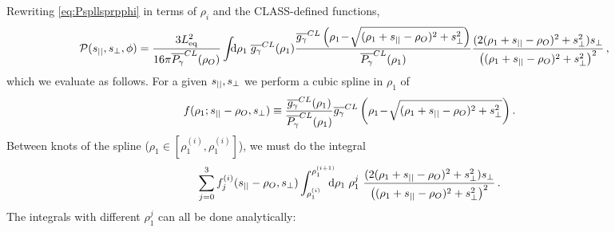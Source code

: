 \documentclass[fleqn,usenatbib]{mnras}
\begin{document}
    Rewriting \autoref{eq:Pspllsprpphi} in terms of $\rho_i$ and the
    CLASS-defined functions,
    \begin{align} \label{eq:Pspllsprpphi_app}
        \mcal{P}(\spll,\sprp,\phi)
            &= \frac{3\Leq^2}{16\pi\PgamBarCL(\rho_O)}
                \int\!\!\! \dif{\rho_1} \; \GgamBarCL(\rho_1) \frac
                {\GgamBarCL\left(\rho_1\! - \! \sqrt{(\rho_1+\spll-\rho_O)^2+ \sprp^2}\right)}{\PgamBarCL(\rho_1)}
                \frac{(2(\rho_1+\spll-\rho_O)^2 + \sprp^2)\sprp}{\left((\rho_1+\spll-\rho_O)^2+\sprp^2\right)^2} \,,
    \end{align} 
    which we evaluate as follows.  For a given $s_{||}, s_{\perp}$ we perform a cubic
    spline in $\rho_1$ of 
    \begin{equation}\label{eq:spline_gPg}
        f(\rho_1;s_{||}-\rho_O,s_{\perp}) \equiv 
        \frac{\overline{g_\gamma}^{CL}(\rho_1)} {\overline{P_{\gamma}}^{CL}(\rho_1)}
                {\overline{g_\gamma}^{CL}\left(\rho_1\! - \! \sqrt{(\rho_1+s_{||}-\rho_O)^2+ s_{\perp}^2}\right)} \,.
    \end{equation}
    Between knots of the spline ($\rho_1\in[\rho_1^{(i)},\rho_1^{(i)}]$), we
    must do the integral
    \begin{equation}\label{eq:spline_integral_P}
        \sum_{j=0}^3 f_j^{(i)}(\spll-\rho_O,\sprp) 
         \int_{\rho_1^{(i)}}^{\rho_1^{(i+1)}}\!\!\!\!\! \dif{\rho_1} \;
         \rho_1^j~
         \frac{(2(\rho_1+\spll-\rho_O)^2 +
                \sprp^2)\sprp}{\left(( \rho_1+\spll-\rho_O)^2+\sprp^2\right)^2} \,.
    \end{equation}
    The integrals with different $\rho_1^j$ can all be done analytically:
\end{document}

